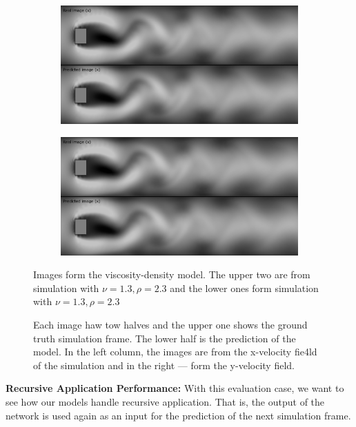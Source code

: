 \documentclass{llncs}
\begin{document}
\begin{figure}
  \begin{subfigure}{.5\textwidth}
    \centering
    \includegraphics[width=1\linewidth]{imgs/single_fluid_x_2}
  \end{subfigure}
  \begin{subfigure}{.5\textwidth}
    \centering
    \includegraphics[width=1\linewidth]{imgs/single_fluid_y_2}
  \end{subfigure}
  \begin{center}
  Images form the viscosity-density model. The upper two are from simulation with $\nu=1.3, \rho=2.3$ and the lower ones form simulation with $\nu=1.3, \rho=2.3$
  \end{center}

  \caption{Each image haw tow halves and the upper one shows the ground truth simulation frame. The lower half is the prediction of the model. In the left column, the images are from the x-velocity fie4ld of the simulation and in the right --- form the y-velocity field.}\label{fig:single_images}
\end{figure}

\noindent\textbf{Recursive Application Performance:}
With this evaluation case, we want to see how our models handle recursive application. That is, the output of the network is used again as an input for the prediction of the next simulation frame.
\end{document}
